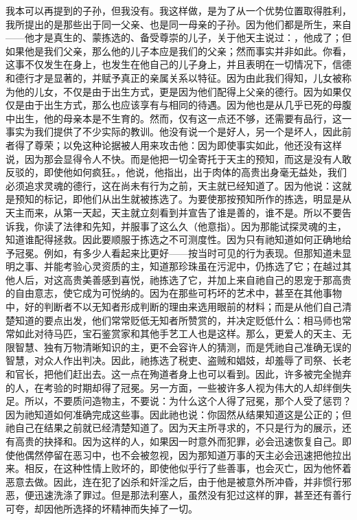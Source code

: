我本可以再提到的子孙，但我没有。我这样做，是为了从一个优势位置取得胜利，我所提出的是那些出于同一父亲、也是同一母亲的子孙。因为他们都是所生，来自——他才是真生的、蒙拣选的、备受尊崇的儿子，关于他天主说过：，他成了；但如果他是我们父亲，那么他的儿子本应是我们的父亲；然而事实并非如此。你看，这事不仅发生在身上，也发生在他自己的儿子身上，并且表明在一切情况下，信德和德行才是显著的，并赋予真正的亲属关系以特征。因为由此我们得知，儿女被称为他的儿女，不仅是由于出生方式，更是因为他们配得上父亲的德行。因为如果仅仅是由于出生方式，那么也应该享有与相同的待遇。因为他也是从几乎已死的母腹中出生，他的母亲本是不生育的。然而，仅有这一点还不够，还需要有品行，这一事实为我们提供了不少实际的教训。他没有说一个是好人，另一个是坏人，因此前者得了尊荣；以免这种论据被人用来攻击他：因为即使事实如此，他还没有这样说，因为那会显得令人不快。而是他把一切全寄托于天主的预知，而这是没有人敢反驳的，即使他如何疯狂。，他说，他指出，出于肉体的高贵出身毫无益处，我们必须追求灵魂的德行，这在尚未有行为之前，天主就已经知道了。因为他说：这就是预知的标记，即他们从出生就被拣选了。为要使那按预知所作的拣选，明显是从天主而来，从第一天起，天主就立刻看到并宣告了谁是善的，谁不是。所以不要告诉我，你读了法律和先知，并服事了这么久（他意指）。因为那能试探灵魂的主，知道谁配得拯救。因此要顺服于拣选之不可测度性。因为只有祂知道如何正确地给予冠冕。例如，有多少人看起来比更好——按当时可见的行为表现。但那知道未显明之事、并能考验心灵资质的主，知道那珍珠虽在污泥中，仍拣选了它；在越过其他人后，对这高贵美善感到喜悦，祂拣选了它，并加上来自祂自己的恩宠于那高贵的自由意志，使它成为可悦纳的。因为在那些可朽坏的艺术中，甚至在其他事物中，好的判断者不以无知者形成判断的理由来选用眼前的材料；而是从他们自己清楚知道的要点出发，他们常常贬低无知者所赞赏的，并决定贬低什么：相马师也常常如此对待马匹，宝石鉴赏家和其他手艺工人也是这样。那么，更爱人的天主、无限智慧、独有万物清晰知识的主，更不会容许人的猜测，而是凭祂自己准确无误的智慧，对众人作出判决。因此，祂拣选了税吏、盗贼和娼妓，却羞辱了司祭、长老和官长，把他们赶出去。这一点在殉道者身上也可以看到。因此，许多被完全抛弃的人，在考验的时期却得了冠冕。另一方面，一些被许多人视为伟大的人却绊倒失足。所以，不要质问造物主，不要说：为什么这个人得了冠冕，那个人受了惩罚？因为祂知道如何准确完成这些事。因此祂也说：你固然从结果知道这是公正的；但祂自己在结果之前就已经清楚知道了。因为天主所寻求的，不只是行为的展示，还有高贵的抉择和。因为这样的人，如果因一时意外而犯罪，必会迅速恢复自己。即使他偶然停留在恶习中，也不会被忽视，因为那知道万事的天主必会迅速把他拉出来。相反，在这种性情上败坏的，即使他似乎行了些善事，也会灭亡，因为他怀着恶意去做。因此，连在犯了凶杀和奸淫之后，由于他是被意外所冲昏，并非惯行邪恶，便迅速洗涤了罪过。但是那法利塞人，虽然没有犯过这样的罪，甚至还有善行可夸，却因他所选择的坏精神而失掉了一切。\par
